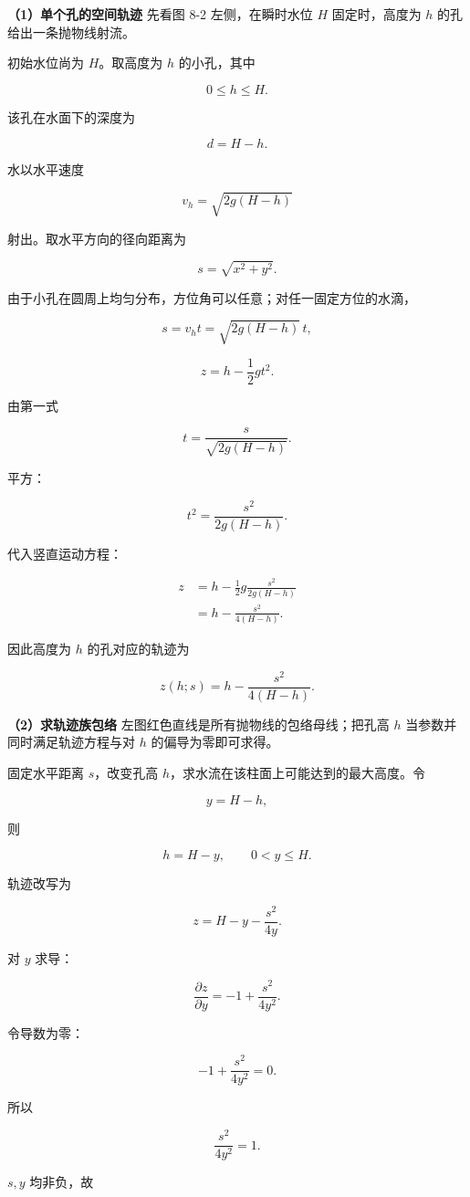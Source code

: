 \documentclass[12pt,a4paper,UTF8]{ctexart}
\begin{document}
\textbf{（1）单个孔的空间轨迹} 先看图 8-2 左侧，在瞬时水位 \(H\)
固定时，高度为 \(h\) 的孔给出一条抛物线射流。

初始水位尚为 \(H\)。取高度为 \(h\) 的小孔，其中

\[0\leq h\leq H.\]

该孔在水面下的深度为

\[d=H-h.\]

水以水平速度

\[v_h=\sqrt{2g(H-h)}\]

射出。取水平方向的径向距离为

\[s=\sqrt{x^2+y^2}.\]

由于小孔在圆周上均匀分布，方位角可以任意；对任一固定方位的水滴，

\[s=v_ht=\sqrt{2g(H-h)}\,t,\]

\[z=h-\frac12gt^2.\]

由第一式

\[t=\frac{s}{\sqrt{2g(H-h)}}.\]

平方：

\[t^2=\frac{s^2}{2g(H-h)}.\]

代入竖直运动方程：

\[\begin{aligned}
z
&=h-\frac12g
\frac{s^2}{2g(H-h)}\\
&=h-\frac{s^2}{4(H-h)}.
\end{aligned}\]

因此高度为 \(h\) 的孔对应的轨迹为

\[z(h;s)=h-\frac{s^2}{4(H-h)}.\]

\textbf{（2）求轨迹族包络} 左图红色直线是所有抛物线的包络母线；把孔高
\(h\) 当参数并同时满足轨迹方程与对 \(h\) 的偏导为零即可求得。

固定水平距离 \(s\)，改变孔高
\(h\)，求水流在该柱面上可能达到的最大高度。令

\[y=H-h,\]

则

\[h=H-y,\qquad 0<y\leq H.\]

轨迹改写为

\[z=H-y-\frac{s^2}{4y}.\]

对 \(y\) 求导：

\[\frac{\partial z}{\partial y}
=-1+\frac{s^2}{4y^2}.\]

令导数为零：

\[-1+\frac{s^2}{4y^2}=0.\]

所以

\[\frac{s^2}{4y^2}=1.\]

\(s,y\) 均非负，故
\end{document}
